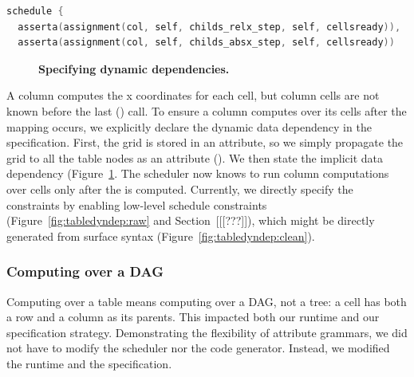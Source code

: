 \newsavebox{\tabledynb}
\begin{lrbox}{\tabledynb}%
\begin{lstlisting}[language=C++,morekeywords={spawn,join,reverse,parallel_for}]
schedule { 
  asserta(assignment(col, self, childs_relx_step, self, cellsready)),
  asserta(assignment(col, self, childs_absx_step, self, cellsready))
\end{lstlisting}
\end{lrbox}


\begin{figure}
\caption{\textbf{Specifying dynamic dependencies.}}
\label{fig:tabledyndep}
\end{figure}

A column computes the x coordinates for each cell, but column cells are not known before the last () call. To ensure a column computes over its cells after the mapping occurs, we explicitly declare the dynamic data dependency in the specification. First, the grid is stored in an attribute, so we simply propagate the grid to all the table nodes as an attribute (). We then state the implicit data dependency (Figure~\ref{fig:tabledyndep}. The scheduler now knows to run column computations over cells only after the  is computed. Currently, we directly specify the constraints by enabling low-level schedule constraints (Figure~\ref{fig:tabledyndep:raw} and Section~[[[???]]), which might be directly generated from surface syntax (Figure~\ref{fig:tabledyndep:clean}).

\subsubsection{Computing over a DAG}
Computing over a table means computing over a DAG, not a tree: a cell has both a row and a column as its parents. This impacted both our runtime and our specification strategy. Demonstrating the flexibility of attribute grammars, we did not have to modify the scheduler nor the code generator. Instead, we modified the runtime and the specification.

